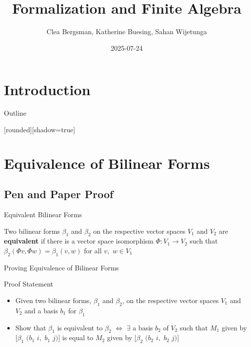 \documentclass[svgnames]{beamer}
\author{Clea Bergsman, Katherine Buesing, Sahan Wijetunga}
\date{2025-07-24}
\title{Formalization and Finite Algebra}
\begin{document}
\section{Introduction}
\maketitle
\begin{frame}{Outline}
\tableofcontents
\end{frame}

[rounded][shadow=true]

\section{Equivalence of Bilinear Forms}
\subsection{Pen and Paper Proof}
\begin{frame}{Equivalent Bilinear Forms}
\begin{Definition}
Two bilinear forms $\beta_1$ and $\beta_2$ on the respective vector spaces $V_1$ and $V_2$ are \textbf{equivalent} if there is a vector space isomorphism $\Phi:V_1\to V_2$ such that $\beta_2 (\Phi v,\Phi w)= \beta_1 (v,w)$ for all $v,$ $w\in V_1$
\end{Definition}
\end{frame}

\begin{frame}[label={sec:proof_comparison},fragile]{Proving Equivalence of Bilinear Forms}
\begin{block}{Proof Statement}
\begin{itemize}
    \item Given two bilinear forms, $\beta_1$ and $\beta_2$, on the respective vector spaces $V_1$ and $V_2$ and a basis $b_1$ for $\beta _1$
    \item Show that $\beta_1$ is equivalent to $\beta_2$ $\iff$ $\exists$ a basis $b_2$ of $V_2$ such that $M_1$ given by $[\beta_1$ $(b_1$ $i,$ $b_1$ $j)]$ is equal to $M_2$ given by $[\beta_2$ $(b_2$ $i,$ $b_2$ $j)]$

\end{itemize}
\end{block}
\end{frame}
\end{document}
